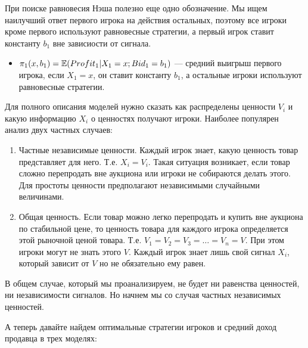 При поиске равновесия Нэша полезно еще одно обозначение. Мы ищем наилучший ответ первого игрока на действия остальных, поэтому все игроки кроме первого используют равновесные стратегии, а первый игрок ставит константу $b_1$ вне зависиости от сигнала.

\begin{itemize}



\item $\pi_{1}(x,b_{1})=\mathbb{E}(Profit_{1}|X_{1}=x ; Bid_{1}=b_{1})$ --- средний выигрыш первого игрока, если $ X_{1}=x $, он ставит константу $b_{1} $, а остальные игроки используют равновесные стратегии.
\end{itemize}

\newpage


Для полного описания моделей нужно сказать как распределены ценности $ V_{i} $ и какую информацию $ X_{i} $ о ценностях получают игроки. Наиболее популярен анализ двух частных случаев:
\begin{enumerate}
\item Частные независимые ценности. Каждый игрок знает, какую ценность товар представляет для него. Т.е. $X_{i}=V_{i}$.
Такая ситуация возникает, если товар сложно перепродать вне аукциона или игроки не собираются делать этого. Для простоты ценности предполагают независимыми случайными величинами.
\item Общая ценность. Если товар можно легко перепродать и купить вне аукциона по стабильной цене, то ценность товара для каждого игрока определяется этой рыночной ценой товара. Т.е. $ V_{1}=V_{2}=V_{3}=\ldots=V_{n}=V $. При этом игроки могут не знать этого $ V $. Каждый игрок знает лишь свой сигнал $ X_{i} $, который зависит от $ V $ но не обязательно ему равен.
\end{enumerate}

В общем случае, который мы проанализируем, не будет ни равенства ценностей, ни независимости сигналов. Но начнем мы со случая частных независимых ценностей.

А теперь давайте найдем оптимальные стратегии игроков и средний доход продавца в трех моделях:


